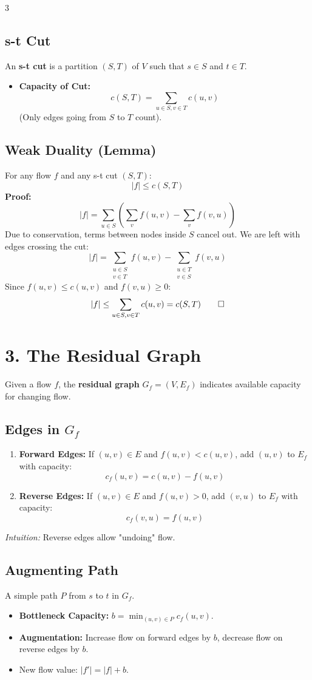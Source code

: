 \documentclass[10pt, a4paper]{article}
\theoremstyle{compact}
\begin{document}
\begin{multicols}{3}
\subsection{s-t Cut}
An \textbf{s-t cut} is a partition $(S, T)$ of $V$ such that $s \in S$ and $t \in T$.
\begin{itemize}
    \item \textbf{Capacity of Cut:} 
    $$c(S,T) = \sum_{u \in S, v \in T} c(u,v)$$
    (Only edges going from $S$ to $T$ count).
\end{itemize}

\subsection{Weak Duality (Lemma)}
For any flow $f$ and any s-t cut $(S,T)$:
$$|f| \le c(S,T)$$
\textbf{Proof:}
$$|f| = \sum_{u \in S} \left( \sum_{v} f(u,v) - \sum_{v} f(v,u) \right)$$
Due to conservation, terms between nodes inside $S$ cancel out. We are left with edges crossing the cut:
$$|f| = \sum_{\substack{u \in S \\ v \in T}} f(u,v) - \sum_{\substack{u \in T \\ v \in S}} f(v,u)$$
Since $f(u,v) \le c(u,v)$ and $f(v,u) \ge 0$:
$$|f| \le \sum_{u \in S, v \in T} c(u,v) = c(S,T) \qed$$

\section{3. The Residual Graph}

Given a flow $f$, the \textbf{residual graph} $G_f = (V, E_f)$ indicates available capacity for changing flow.

\subsection{Edges in $G_f$}
\begin{enumerate}
    \item \textbf{Forward Edges:} If $(u,v) \in E$ and $f(u,v) < c(u,v)$, add $(u,v)$ to $E_f$ with capacity:
    $$c_f(u,v) = c(u,v) - f(u,v)$$
    \item \textbf{Reverse Edges:} If $(u,v) \in E$ and $f(u,v) > 0$, add $(v,u)$ to $E_f$ with capacity:
    $$c_f(v,u) = f(u,v)$$
\end{enumerate}
\textit{Intuition:} Reverse edges allow "undoing" flow.

\subsection{Augmenting Path}
A simple path $P$ from $s$ to $t$ in $G_f$.
\begin{itemize}
    \item \textbf{Bottleneck Capacity:} $b = \min_{(u,v) \in P} c_f(u,v)$.
    \item \textbf{Augmentation:} Increase flow on forward edges by $b$, decrease flow on reverse edges by $b$.
    \item New flow value: $|f'| = |f| + b$.
\end{itemize}


\end{multicols}
\end{document}
